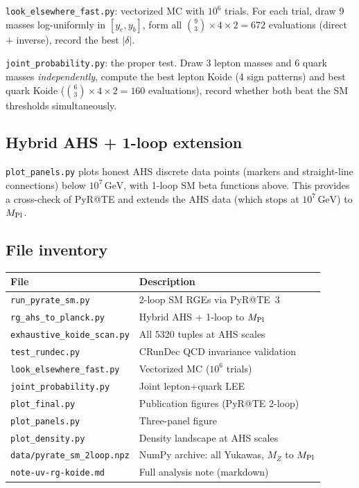 \documentclass[11pt,a4paper]{article}
\newcommand{\GeV}{\,\text{GeV}}
\newcommand{\MZ}{M_Z}
\newcommand{\MPl}{M_{\rm Pl}}
\begin{document}
\texttt{look\_elsewhere\_fast.py}: vectorized MC with $10^6$ trials.
For each trial, draw 9 masses log-uniformly in $[y_e, y_b]$, form all
$\binom{9}{3} \times 4 \times 2 = 672$ evaluations (direct $+$ inverse),
record the best $|\delta|$.

\texttt{joint\_probability.py}: the proper test. Draw 3 lepton masses
and 6 quark masses \emph{independently}, compute the best lepton
Koide (4 sign patterns) and best quark Koide
($\binom{6}{3} \times 4 \times 2 = 160$ evaluations), record whether
both beat the SM thresholds simultaneously.

\subsection{Hybrid AHS + 1-loop extension}

\texttt{plot\_panels.py} plots honest AHS discrete data points
(markers and straight-line connections) below $10^7\GeV$, with 1-loop
SM beta functions above. This provides a cross-check of PyR@TE and
extends the AHS data (which stops at $10^7\GeV$) to $\MPl$.

\subsection{File inventory}

\begin{center}
\footnotesize
\begin{tabular}{ll}
\toprule
File & Description \\
\midrule
\texttt{run\_pyrate\_sm.py}       & 2-loop SM RGEs via PyR@TE~3 \\
\texttt{rg\_ahs\_to\_planck.py}   & Hybrid AHS + 1-loop to $\MPl$ \\
\texttt{exhaustive\_koide\_scan.py} & All 5320 tuples at AHS scales \\
\texttt{test\_rundec.py}          & CRunDec QCD invariance validation \\
\texttt{look\_elsewhere\_fast.py}  & Vectorized MC ($10^6$ trials) \\
\texttt{joint\_probability.py}    & Joint lepton+quark LEE \\
\texttt{plot\_final.py}           & Publication figures (PyR@TE 2-loop) \\
\texttt{plot\_panels.py}          & Three-panel figure \\
\texttt{plot\_density.py}         & Density landscape at AHS scales \\
\texttt{data/pyrate\_sm\_2loop.npz} & NumPy archive: all Yukawas, $\MZ$ to $\MPl$ \\
\texttt{note-uv-rg-koide.md}     & Full analysis note (markdown) \\
\bottomrule
\end{tabular}
\end{center}
\end{document}
